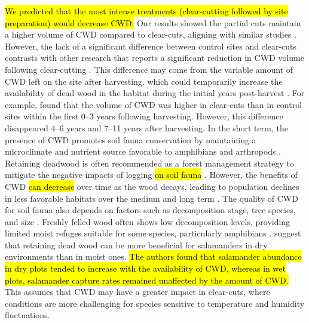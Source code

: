 \hl{We predicted that the most intense treatments (clear-cutting followed by site preparation) would decrease CWD. }
Our results showed the partial cuts maintain a higher volume of CWD compared to clear-cuts, aligning with similar studies \citep{Nolet2018Comparingeffects,Ochs2022Responseterrestrial}. 
However, the lack of a significant difference between control sites and clear-cuts contrasts with other research that reports a significant reduction in CWD volume following clear-cutting \citep{Farnell2020effectsvariable}. 
This difference may come from the variable amount of CWD left on the site after harvesting, which could temporarily increase the availability of dead wood in the habitat during the initial years post-harvest \citep{McCarthy1994Distributionabundance,Etcheverry2005Responsesmall}. 
For example, \cite{Ochs2022Responseterrestrial} found that the volume of CWD was higher in clear-cuts than in control sites within the first 0–3 years following harvesting. 
However, this difference disappeared 4–6 years and 7–11 years after harvesting. 
In the short term, the presence of CWD promotes soil fauna conservation by maintaining a microclimate and nutrient source favorable to amphibians and arthropods \citep{spotilaRoleTemperatureWater1972,Huhta1976Effectsclearcutting,Seibold2021contributioninsects,Ochs2022Responseterrestrial}. 
Retaining deadwood is often recommended as a forest management strategy to mitigate the negative impacts of logging \hl{on soil fauna} \citep{McKenny2006Effectsstructural,Raymond-Leonard2020Deadwood}. 
However, the benefits of CWD \hl{can decrease} over time as the wood decays, leading to population declines in less favorable habitats over the medium and long term \citep{Ochs2022Responseterrestrial}. 
The quality of CWD for soil fauna also depends on factors such as decomposition stage, tree species, and size \citep{Bunnell2010woodbiodiversity}. 
Freshly felled wood often shows low decomposition levels, providing limited moist refuges suitable for some species, particularly amphibians \citep{Petranka1994Effectstimber,Morneault2004effectshelterwood,Owens2008Amphibianreptile,Otto2013Amphibianresponse}. 
\cite{Petranka1994Effectstimber} suggest that retaining dead wood can be more beneficial for salamanders in dry environments than in moist ones. 
\hl{The authors found that salamander abundance in dry plots tended to increase with the availability of CWD, whereas in wet plots, salamander capture rates remained unaffected by the amount of CWD.}
This assumes that CWD may have a greater impact in clear-cuts, where conditions are more challenging for species sensitive to temperature and humidity fluctuations.
 
